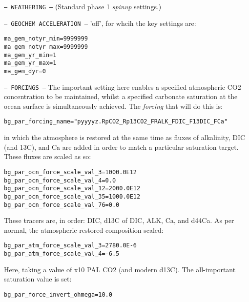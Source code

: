 \documentclass[10pt,twoside]{article}
\begin{document}
\begin{compactitem}
        \item \texttt{--- WEATHERING ---}
        (Standard phase 1 \textit{spinup} settings.)
        
        \item \texttt{--- GEOCHEM ACCELERATION ---}
        'off', for whcih the key settings are:
                        \vspace{-5pt}\begin{verbatim}
ma_gem_notyr_min=9999999
ma_gem_notyr_max=9999999
ma_gem_yr_min=1
ma_gem_yr_max=1
ma_gem_dyr=0
                \end{verbatim}\vspace{-5pt}
        
        \item \texttt{--- FORCINGS ---}
        The important setting here enables a specified atmospheric CO2 concentration to be maintained, whilst a specified carbonate saturation at the ocean surface is simultaneously achieved. The \textit{forcing} that will do this is:
                        \vspace{-5pt}\begin{verbatim}
bg_par_forcing_name="pyyyyz.RpCO2_Rp13CO2_FRALK_FDIC_F13DIC_FCa"
                \end{verbatim}\vspace{-5pt}
                in which the atmosphere is restored at the same time as fluxes of alkalinity, DIC (and 13C), and Ca are added in order to match a particular saturation target.
                These fluxes are scaled as so:
                        \vspace{-5pt}\begin{verbatim}
bg_par_ocn_force_scale_val_3=1000.0E12
bg_par_ocn_force_scale_val_4=0.0
bg_par_ocn_force_scale_val_12=2000.0E12
bg_par_ocn_force_scale_val_35=1000.0E12
bg_par_ocn_force_scale_val_76=0.0
                \end{verbatim}\vspace{-5pt}
                These tracers are, in order: DIC, d13C of DIC, ALK, Ca, and d44Ca.
                As per normal, the atmospheric restored composition scaled:
                        \vspace{-5pt}\begin{verbatim}
bg_par_atm_force_scale_val_3=2780.0E-6
bg_par_atm_force_scale_val_4=-6.5
                \end{verbatim}\vspace{-5pt}
                Here, taking a value of  x10 PAL CO2 (and modern d13C).
                The all-important saturation value is set:
                        \vspace{-5pt}\begin{verbatim}
bg_par_force_invert_ohmega=10.0
                \end{verbatim}\vspace{-5pt}


\end{compactitem}
\end{document}
